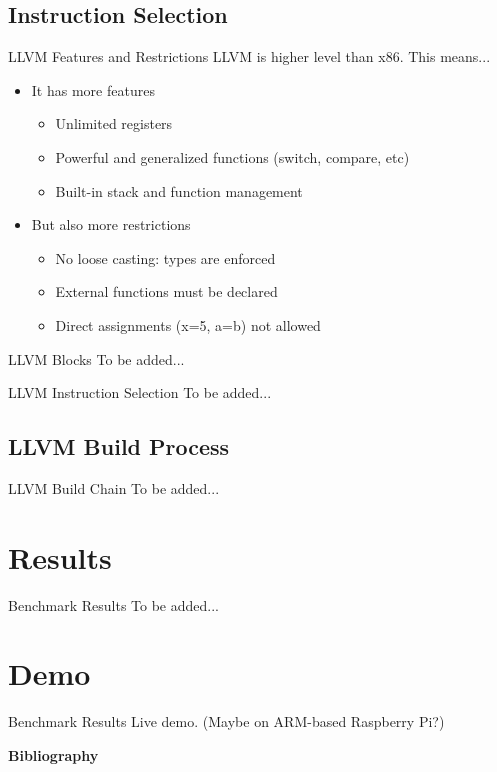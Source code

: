 \documentclass{beamer}
\begin{document}
\subsection{Instruction Selection}

\begin{frame}{LLVM Features and Restrictions}
  LLVM is higher level than x86. This means...
  \pause
  \begin{itemize}
  \item<1->It has more features
    \begin{itemize}
    \item<2->Unlimited registers
    \item<3->Powerful and generalized functions (switch, compare, etc)
    \item<4->Built-in stack and function management
    \end{itemize}
  \item<5->But also more restrictions
    \begin{itemize}
      \item<6-> No loose casting: types are enforced
      \item<7-> External functions must be declared
      \item<8-> Direct assignments (x=5, a=b) not allowed
    \end{itemize}
  \end{itemize}
\end{frame}

\begin{frame}{LLVM Blocks}
  To be added...
\end{frame}

\begin{frame}{LLVM Instruction Selection}
  To be added...
\end{frame}

\subsection{LLVM Build Process}

\begin{frame}{LLVM Build Chain}
  To be added...
\end{frame}

\section{Results}

\begin{frame}{Benchmark Results}
  To be added...
\end{frame}

\section{Demo}

\begin{frame}{Benchmark Results}
  Live demo. (Maybe on ARM-based Raspberry Pi?)
\end{frame}

\begin{frame}[t,allowframebreaks]{\bf Bibliography}
  \nocite{*}
  \printbibliography
\end{frame}
\end{document}
